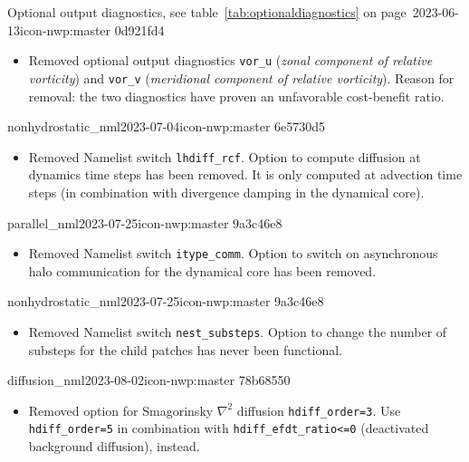 \begin{changeitem}{Optional output diagnostics, see table~\ref{tab:optionaldiagnostics} on page~\pageref{tab:optionaldiagnostics}}{2023-06-13}{icon-nwp:master 0d921fd4}
  \begin{itemize}
   \item Removed optional output diagnostics \texttt{vor\_u} (\emph{zonal component of relative vorticity}) and \texttt{vor\_v} (\emph{meridional component of relative vorticity}). 
   Reason for removal: the two diagnostics have proven an unfavorable cost-benefit ratio.
  \end{itemize}
\end{changeitem}

\begin{changeitem}{nonhydrostatic\_nml}{2023-07-04}{icon-nwp:master 6e5730d5}
  \begin{itemize}
   \item Removed Namelist switch \texttt{lhdiff\_rcf}. Option to compute diffusion at dynamics time steps has been removed. It is only computed at advection time steps (in combination with divergence damping in the dynamical core).
  \end{itemize}
\end{changeitem}

\begin{changeitem}{parallel\_nml}{2023-07-25}{icon-nwp:master 9a3c46e8}
  \begin{itemize}
   \item Removed Namelist switch \texttt{itype\_comm}. Option to switch on asynchronous halo communication for the dynamical core has been removed.
  \end{itemize}
\end{changeitem}

\begin{changeitem}{nonhydrostatic\_nml}{2023-07-25}{icon-nwp:master 9a3c46e8}
  \begin{itemize}
   \item Removed Namelist switch \texttt{nest\_substeps}. Option to change the number of substeps for the child patches has never been functional.
  \end{itemize}
\end{changeitem}

\begin{changeitem}{diffusion\_nml}{2023-08-02}{icon-nwp:master 78b68550}
  \begin{itemize}
   \item Removed option for Smagorinsky $\nabla^{2}$ diffusion \texttt{hdiff\_order=3}. Use \texttt{hdiff\_order=5} in combination with \texttt{hdiff\_efdt\_ratio<=0} (deactivated background diffusion), instead.
  \end{itemize}
\end{changeitem}

